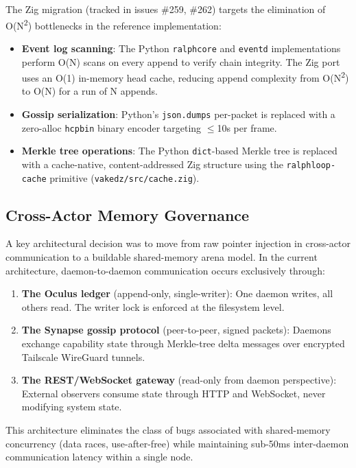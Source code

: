 \documentclass[conference]{IEEEtran}
\begin{document}
The Zig migration (tracked in issues \#259, \#262) targets the elimination of
O(N\textsuperscript{2}) bottlenecks in the reference implementation:

\begin{itemize}
\item \textbf{Event log scanning}: The Python \texttt{ralphcore} and
\texttt{eventd} implementations perform O(N) scans on every append to verify
chain integrity. The Zig port uses an O(1) in-memory head cache, reducing
append complexity from O(N\textsuperscript{2}) to O(N) for a run of N appends.
\item \textbf{Gossip serialization}: Python's \texttt{json.dumps} per-packet
is replaced with a zero-alloc \texttt{hcpbin} binary encoder targeting
$\leq$10\textmu s per frame.
\item \textbf{Merkle tree operations}: The Python \texttt{dict}-based Merkle tree
is replaced with a cache-native, content-addressed Zig structure using the
\texttt{ralphloop-cache} primitive (\texttt{vakedz/src/cache.zig}).
\end{itemize}

\subsection{Cross-Actor Memory Governance}

A key architectural decision was to move from raw pointer injection in
cross-actor communication to a buildable shared-memory arena model. In the
current architecture, daemon-to-daemon communication occurs exclusively
through:

\begin{enumerate}
\item \textbf{The Oculus ledger} (append-only, single-writer): One daemon writes,
all others read. The writer lock is enforced at the filesystem level.
\item \textbf{The Synapse gossip protocol} (peer-to-peer, signed packets):
Daemons exchange capability state through Merkle-tree delta messages over
encrypted Tailscale WireGuard tunnels.
\item \textbf{The REST/WebSocket gateway} (read-only from daemon perspective):
External observers consume state through HTTP and WebSocket, never modifying
system state.
\end{enumerate}

This architecture eliminates the class of bugs associated with shared-memory
concurrency (data races, use-after-free) while maintaining sub-50ms inter-daemon
communication latency within a single node.
\end{document}
